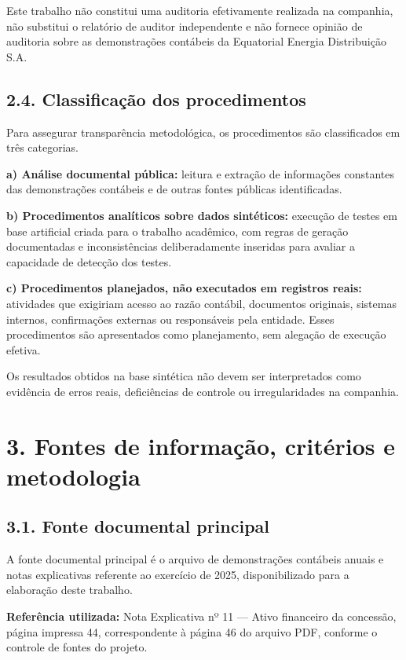 \documentclass[
]{article}
\begin{document}
Este trabalho não constitui uma auditoria efetivamente realizada na
companhia, não substitui o relatório de auditor independente e não
fornece opinião de auditoria sobre as demonstrações contábeis da
Equatorial Energia Distribuição S.A.

\subsection{2.4. Classificação dos
procedimentos}\label{classificauxe7uxe3o-dos-procedimentos}

Para assegurar transparência metodológica, os procedimentos são
classificados em três categorias.

\textbf{a) Análise documental pública:} leitura e extração de
informações constantes das demonstrações contábeis e de outras fontes
públicas identificadas.

\textbf{b) Procedimentos analíticos sobre dados sintéticos:} execução de
testes em base artificial criada para o trabalho acadêmico, com regras
de geração documentadas e inconsistências deliberadamente inseridas para
avaliar a capacidade de detecção dos testes.

\textbf{c) Procedimentos planejados, não executados em registros reais:}
atividades que exigiriam acesso ao razão contábil, documentos originais,
sistemas internos, confirmações externas ou responsáveis pela entidade.
Esses procedimentos são apresentados como planejamento, sem alegação de
execução efetiva.

Os resultados obtidos na base sintética não devem ser interpretados como
evidência de erros reais, deficiências de controle ou irregularidades na
companhia.

\section{3. Fontes de informação, critérios e
metodologia}\label{fontes-de-informauxe7uxe3o-crituxe9rios-e-metodologia}

\subsection{3.1. Fonte documental
principal}\label{fonte-documental-principal}

A fonte documental principal é o arquivo de demonstrações contábeis
anuais e notas explicativas referente ao exercício de 2025,
disponibilizado para a elaboração deste trabalho.

\textbf{Referência utilizada:} Nota Explicativa nº 11 --- Ativo
financeiro da concessão, página impressa 44, correspondente à página 46
do arquivo PDF, conforme o controle de fontes do projeto.
\end{document}
